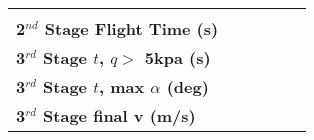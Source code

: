 \begin{table}[ht]
\begin{tabular}{l c c c c c}
	& \secondthirdSeparationLDCdninetyfivepercent
	& \secondthirdSeparationLDCdonehundredpercent
	& \secondthirdSeparationLDCdonehundredandfivepercent
	& \secondthirdSeparationLDCdonehundredandtenpercent
	\\
	\textbf{2$^{nd}$ Stage Flight Time (s)}
	& \secondFlightTimeCdninetypercent
	& \secondFlightTimeCdninetyfivepercent
	& \secondFlightTimeCdonehundredpercent
	& \secondFlightTimeCdonehundredandfivepercent
	& \secondFlightTimeCdonehundredandtenpercent
	\\
	\textbf{3$^{rd}$ Stage $t$, $q >$ 5kpa (s)}
	& \thirdqOverFiveCdninetypercent
	& \thirdqOverFiveCdninetyfivepercent
	& \thirdqOverFiveCdonehundredpercent
	& \thirdqOverFiveCdonehundredandfivepercent
	& \thirdqOverFiveCdonehundredandtenpercent
	\\
	\textbf{3$^{rd}$ Stage $t$, max $\alpha$ (deg)}
	& \thirdmaxAoACdninetypercent
	& \thirdmaxAoACdninetyfivepercent
	& \thirdmaxAoACdonehundredpercent
	& \thirdmaxAoACdonehundredandfivepercent
	& \thirdmaxAoACdonehundredandtenpercent
	\\
	\hline \textbf{3$^{rd}$ Stage final v (m/s)}
	& \thirdcircvCdninetypercent
	& \thirdcircvCdninetyfivepercent
	& \thirdcircvCdonehundredpercent
	& \thirdcircvCdonehundredandfivepercent
	& \thirdcircvCdonehundredandtenpercent
	\\
	\hline 
\end{tabular} 
\end{table}
